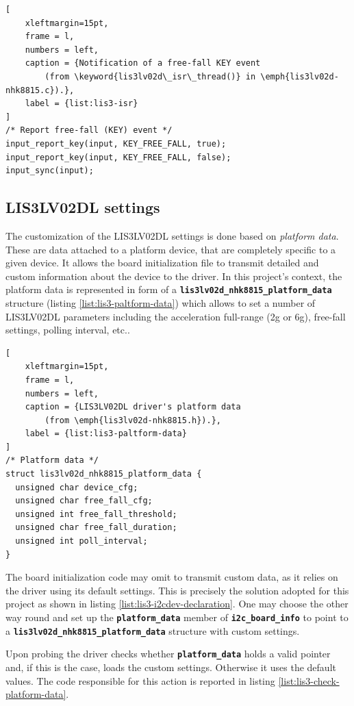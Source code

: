 \documentclass[a4paper,10pt]{article}
\newcommand{\keyword}[1]{\texttt{\textbf{#1}}}
\begin{document}
\begin{multicols}{2}
\begin{lstlisting}[
	xleftmargin=15pt,
	frame = l,
	numbers = left,
	caption = {Notification of a free-fall KEY event
		(from \keyword{lis3lv02d\_isr\_thread()} in \emph{lis3lv02d-nhk8815.c}).},
	label = {list:lis3-isr}
]
/* Report free-fall (KEY) event */
input_report_key(input, KEY_FREE_FALL, true);
input_report_key(input, KEY_FREE_FALL, false);
input_sync(input);
\end{lstlisting}


\subsection{LIS3LV02DL settings}
\label{sec:lis3_settings}

The customization of the LIS3LV02DL settings is done based on \emph{platform 
data}.
These are data attached to a platform device, that are completely specific to
a given device. It allows the board initialization file to transmit detailed and
custom information about the device to the driver.
In this project's context, the platform data is represented in form of a
\keyword{lis3lv02d\_nhk8815\_platform\_data} structure
(listing \ref{list:lis3-paltform-data}) which allows to set a number of 
LIS3LV02DL parameters including the acceleration full-range (2g or 6g), free-fall 
settings, polling interval, etc..

\begin{lstlisting}[
	xleftmargin=15pt,
	frame = l,
	numbers = left,
	caption = {LIS3LV02DL driver's platform data
		(from \emph{lis3lv02d-nhk8815.h}).},
	label = {list:lis3-paltform-data}
]
/* Platform data */
struct lis3lv02d_nhk8815_platform_data {
  unsigned char device_cfg;
  unsigned char free_fall_cfg;
  unsigned int free_fall_threshold;
  unsigned char free_fall_duration;
  unsigned int poll_interval;
}
\end{lstlisting}

The board initialization code may omit to transmit custom data, as it relies on
the driver using its default settings. This is precisely the solution adopted for
this project as shown in listing \ref{list:lis3-i2cdev-declaration}.
One may choose the other way round and set up the \keyword{platform\_data}
member of \keyword{i2c\_board\_info} to point to a 
\keyword{lis3lv02d\_nhk8815\_platform\_data} structure with custom settings.

Upon probing the driver checks whether \keyword{platform\_data} holds a valid
pointer and, if this is the case, loads the custom settings. Otherwise it uses
the default values. The code responsible for this action is reported in listing
\ref{list:lis3-check-platform-data}.


\end{multicols}
\end{document}
